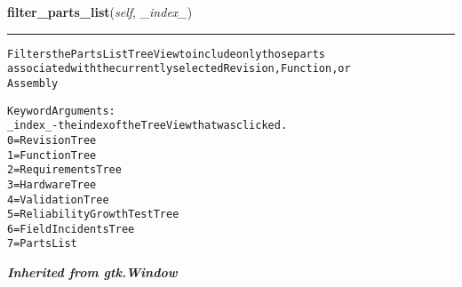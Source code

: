 \hspace{.8\funcindent}\begin{boxedminipage}{\funcwidth}

    \raggedright \textbf{filter\_parts\_list}(\textit{self}, \textit{\_index\_})

    \vspace{-1.5ex}

    \rule{\textwidth}{0.5\fboxrule}
\setlength{\parskip}{2ex}
\begin{alltt}
Filters the PartsList TreeView to include only those parts
associated with the currently selected Revision, Function, or
Assembly

Keyword Arguments:
\_index\_ - the index of the TreeView that was clicked.
          0 = Revision Tree
          1 = Function Tree
          2 = Requirements Tree
          3 = Hardware Tree
          4 = Validation Tree
          5 = Reliability Growth Test Tree
          6 = Field Incidents Tree
          7 = Parts List
\end{alltt}

\setlength{\parskip}{1ex}
    \end{boxedminipage}


\large{\textbf{\textit{Inherited from gtk.Window}}}

